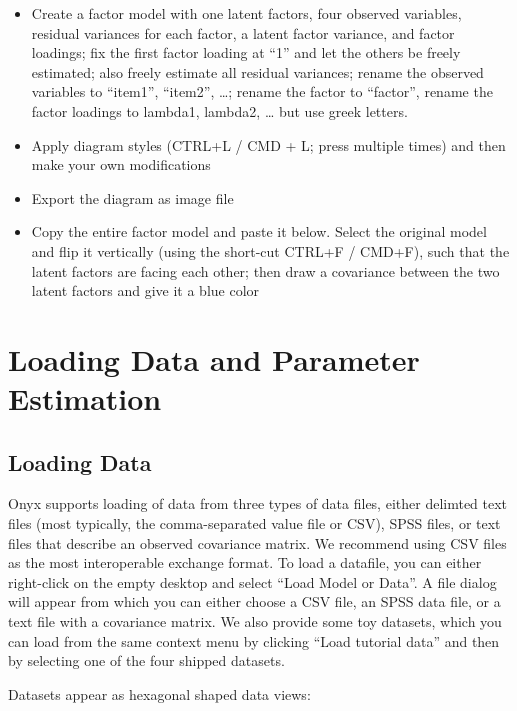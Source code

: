 \documentclass[
  letterpaper,
  DIV=11,
  numbers=noendperiod]{scrreprt}
\providecommand{\tightlist}{%
  \setlength{\itemsep}{0pt}\setlength{\parskip}{0pt}}\usepackage{longtable,booktabs,array}
\begin{document}
\begin{itemize}
\tightlist
\item
  Create a factor model with one latent factors, four observed
  variables, residual variances for each factor, a latent factor
  variance, and factor loadings; fix the first factor loading at ``1''
  and let the others be freely estimated; also freely estimate all
  residual variances; rename the observed variables to ``item1'',
  ``item2'', \ldots; rename the factor to ``factor'', rename the factor
  loadings to lambda1, lambda2, \ldots{} but use greek letters.
\item
  Apply diagram styles (CTRL+L / CMD + L; press multiple times) and then
  make your own modifications
\item
  Export the diagram as image file
\item
  Copy the entire factor model and paste it below. Select the original
  model and flip it vertically (using the short-cut CTRL+F / CMD+F),
  such that the latent factors are facing each other; then draw a
  covariance between the two latent factors and give it a blue color
\end{itemize}


\chapter{Loading Data and Parameter
Estimation}\label{loading-data-and-parameter-estimation}

\section{Loading Data}\label{loading-data}

Onyx supports loading of data from three types of data files, either
delimted text files (most typically, the comma-separated value file or
CSV), SPSS files, or text files that describe an observed covariance
matrix. We recommend using CSV files as the most interoperable exchange
format. To load a datafile, you can either right-click on the empty
desktop and select ``Load Model or Data''. A file dialog will appear
from which you can either choose a CSV file, an SPSS data file, or a
text file with a covariance matrix. We also provide some toy datasets,
which you can load from the same context menu by clicking ``Load
tutorial data'' and then by selecting one of the four shipped datasets.

Datasets appear as hexagonal shaped data views:
\end{document}

